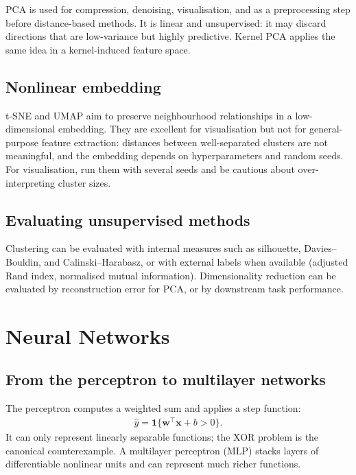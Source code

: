 \documentclass[a4paper, 12pt]{book}
\begin{document}
PCA is used for compression, denoising, visualisation, and as a preprocessing step
before distance-based methods. It is linear and unsupervised: it may discard
directions that are low-variance but highly predictive. Kernel PCA applies the same
idea in a kernel-induced feature space.

\section{Nonlinear embedding}

t-SNE and UMAP aim to preserve neighbourhood relationships in a low-dimensional
embedding. They are excellent for visualisation but not for general-purpose feature
extraction: distances between well-separated clusters are not meaningful, and the
embedding depends on hyperparameters and random seeds. For visualisation, run them
with several seeds and be cautious about over-interpreting cluster sizes.

\section{Evaluating unsupervised methods}

Clustering can be evaluated with internal measures such as silhouette, Davies--Bouldin,
and Calinski--Harabasz, or with external labels when available (adjusted Rand index,
normalised mutual information). Dimensionality reduction can be evaluated by
reconstruction error for PCA, or by downstream task performance.


\chapter{Neural Networks}
\label{ch:nn}

\section{From the perceptron to multilayer networks}

The perceptron computes a weighted sum and applies a step function:
\begin{align}
    \hat{y} = \mathbf{1}\{\mathbf{w}^\top\mathbf{x}+b > 0\}.
\end{align}
It can only represent linearly separable functions; the XOR problem is the canonical
counterexample. A multilayer perceptron (MLP) stacks layers of differentiable
nonlinear units and can represent much richer functions.
\end{document}

